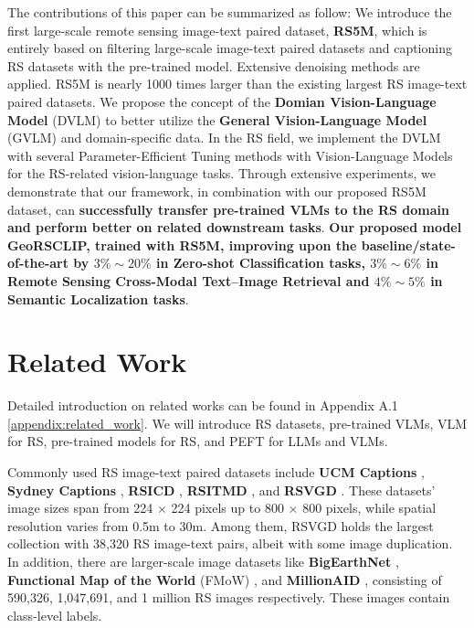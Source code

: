 \documentclass[journal]{IEEEtran}
\begin{document}
The contributions of this paper can be summarized as follow:  We introduce the first large-scale remote sensing image-text paired dataset, \textbf{RS5M}, which is entirely based on filtering large-scale image-text paired datasets and captioning RS datasets with the pre-trained model. Extensive denoising methods are applied. RS5M is nearly 1000 times larger than the existing largest RS image-text paired datasets.  We propose the concept of the \textbf{Domian Vision-Language Model} (DVLM) to better utilize the \textbf{General Vision-Language Model} (GVLM) and domain-specific data. In the RS field, we implement the DVLM with several Parameter-Efficient Tuning methods with Vision-Language Models for the RS-related vision-language tasks. Through extensive experiments, we demonstrate that our framework, in combination with our proposed RS5M dataset, can \textbf{successfully transfer pre-trained VLMs to the RS domain and perform better on related downstream tasks}. \textbf{Our proposed model GeoRSCLIP, trained with RS5M, improving upon the baseline/state-of-the-art by $3\%\sim20\%$ in Zero-shot Classification tasks, $3\%\sim6\%$ in Remote Sensing Cross-Modal Text–Image Retrieval and $4\%\sim5\%$ in Semantic Localization tasks}. 


\section{Related Work} \label{relatedwork}
Detailed introduction on related works can be found in Appendix A.1 \ref{appendix:related_work}. We will introduce RS datasets, pre-trained VLMs, VLM for RS, pre-trained models for RS, and PEFT for LLMs and VLMs. 

Commonly used RS image-text paired datasets include \textbf{UCM Captions} \cite{UCMSydeney}, \textbf{Sydney Captions} \cite{UCMSydeney}, \textbf{RSICD} \cite{RSICD}, \textbf{RSITMD} \cite{RSITMD}, and \textbf{RSVGD} \cite{rsvg}. These datasets' image sizes span from 224 $\times$ 224 pixels up to 800 $\times$ 800 pixels, while spatial resolution varies from 0.5m to 30m. Among them, RSVGD holds the largest collection with 38,320 RS image-text pairs, albeit with some image duplication. In addition, there are larger-scale image datasets like \textbf{BigEarthNet} \cite{bigearthnet}, \textbf{Functional Map of the World} (FMoW) \cite{fmow}, and \textbf{MillionAID} \cite{millionaid}, consisting of 590,326, 1,047,691, and 1 million RS images respectively. These images contain class-level labels.
\end{document}
